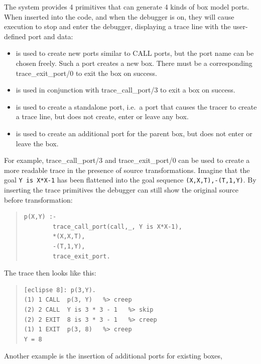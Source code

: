 The system provides 4 primitives that can generate 4 kinds of box model ports.
When inserted into the code, and when the debugger is on,
they will cause execution to stop and enter the debugger,
displaying a trace line with the user-defined port and data:
\begin{itemize}
\item {}
	is used to create new ports similar to CALL ports, but the port name
	can be chosen freely. Such a port creates a new box. There must be
	a corresponding trace_exit_port/0 to exit the box on success.
\item {}
	is used in conjunction with trace_call_port/3 to exit a box
	on success.
\item {}
	is used to create a standalone port, i.e.\ a port that causes the
	tracer to create a trace line, but does not create, enter or leave
	any box.
\item {}
	is used to create an additional port for the parent box, but does
	not enter or leave the box.
\end{itemize}
For example, trace_call_port/3 and trace_exit_port/0 can be used to
create a more readable trace in the presence of source
transformations.  Imagine that the goal {\tt Y is X*X-1}
has been flattened into the goal sequence {\tt *(X,X,T),-(T,1,Y)}. 
By inserting the trace primitives the debugger can still show the
original source before transformation:
\begin{quote}\begin{verbatim}
p(X,Y) :- 
        trace_call_port(call,_, Y is X*X-1),
        *(X,X,T),
        -(T,1,Y),
        trace_exit_port.
\end{verbatim}\end{quote}
The trace then looks like this:
\begin{quote}\begin{verbatim}
[eclipse 8]: p(3,Y).
(1) 1 CALL  p(3, Y)   %> creep
(2) 2 CALL  Y is 3 * 3 - 1   %> skip
(2) 2 EXIT  8 is 3 * 3 - 1   %> creep
(1) 1 EXIT  p(3, 8)   %> creep
Y = 8
\end{verbatim}\end{quote}
Another example is the insertion of additional ports for existing boxes,
